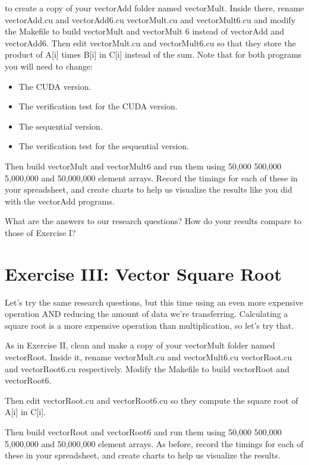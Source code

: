 \documentclass[letterpaper,10pt,openany,oneside]{sphinxmanual}
\begin{document}
to create a copy of your vectorAdd folder named vectorMult. Inside there,
rename vectorAdd.cu and vectorAdd6.cu vectorMult.cu and vectorMult6.cu
and modify the Makefile to build vectorMult and vectorMult 6 instead of vectorAdd and vectorAdd6.
Then edit vectorMult.cu and vectorMult6.cu so that they store the
product of A{[}i{]} times B{[}i{]} in C{[}i{]} instead of the sum.
Note that for both programs you will need to change:
\begin{itemize}
\item {} 
The CUDA version.

\item {} 
The verification test for the CUDA version.

\item {} 
The sequential version.

\item {} 
The verification test for the sequential version.

\end{itemize}

Then build vectorMult and vectorMult6 and run them using 50,000
500,000 5,000,000 and 50,000,000 element arrays.
Record the timings for each of these in your spreadsheet,
and create charts to help us visualize the results
like you did with the vectorAdd programs.

What are the answers to our research questions?
How do your results compare to those of Exercise I?


\section{Exercise III: Vector Square Root}
\label{2-MoreExercises/MoreExercises:exercise-iii-vector-square-root}
Let's try the same research questions, but this time using an even
more expensive operation AND reducing the amount of data we're transferring.
Calculating a square root is a more expensive operation than multiplication, so let's try that.

As in Exercise II, clean and make a copy of your vectorMult folder named vectorRoot.
Inside it, rename vectorMult.cu and vectorMult6.cu vectorRoot.cu and vectorRoot6.cu respectively.
Modify the Makefile to build vectorRoot and vectorRoot6.

Then edit vectorRoot.cu and vectorRoot6.cu so they compute the square root of A{[}i{]} in C{[}i{]}.

Then build vectorRoot and vectorRoot6 and run them using 50,000
500,000 5,000,000 and 50,000,000 element arrays.
As before, record the timings for each of these in your
spreadsheet, and create charts to help us visualize the results.
\end{document}
